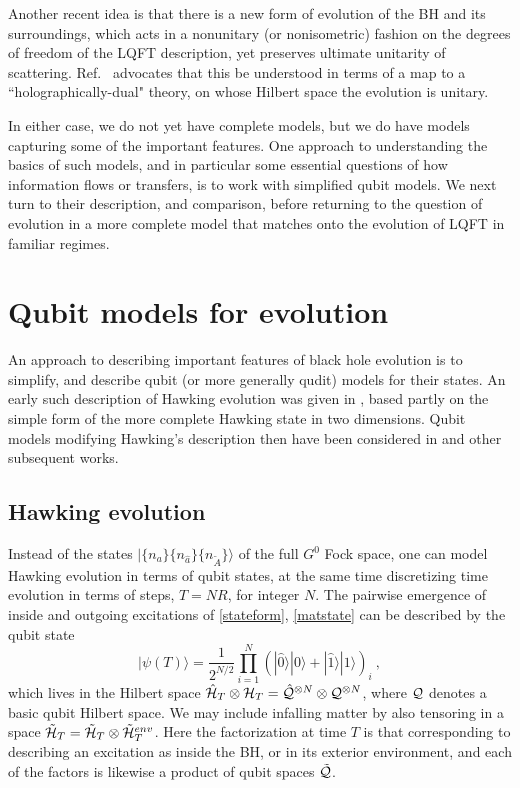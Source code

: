 \documentclass[12pt]{article}
\numberwithin{equation}{section}
\newcommand{\calh}{{\cal H}}
\newcommand{\calq}{{\cal Q}}
\newcommand{\beq}{\begin{equation}}
\newcommand{\eeq}{\end{equation}}
\begin{document}
Another recent idea\cite{AEHPV} is that there is a new form of evolution of the BH and its surroundings, which acts in a nonunitary (or nonisometric) fashion on the degrees of freedom of the LQFT description, yet preserves ultimate unitarity of scattering.  Ref.~\cite{AEHPV} advocates that this be understood in terms of a map to a ``holographically-dual" theory, on whose Hilbert space the evolution is unitary.  

In either case, we do not yet have complete models, but we do have models capturing some of the important features.  One approach to understanding the basics of such models, and in particular some essential questions of how information flows or transfers, is to work with simplified qubit models.  We next turn to their description, and comparison, before returning to the question of evolution in a more complete model that matches onto the evolution of LQFT in familiar regimes.


\section{Qubit models for evolution}

An approach to describing important features of black hole evolution is to simplify, and describe qubit (or more generally qudit) models for their states. An early such description of Hawking evolution was given in \cite{Mathinforev}, based partly on the simple form of the more complete Hawking state in two dimensions\cite{GiNe}.  Qubit models modifying Hawking's description then have been considered in \cite{Mathinforev,SGmodels,BHQIUE,GiShone} and other subsequent works.

\subsection{Hawking evolution}

Instead of the states $|{\{n_a\}\{n_{\hat a}\}\{n_{\tilde A}\}}\rangle$ of the full $G^0$ Fock space, one can model Hawking evolution in terms of qubit states, at the same time discretizing time evolution in terms of steps, $T=NR$, for integer $N$.  The pairwise emergence of inside and outgoing excitations of  \eqref{stateform}, \eqref{matstate} can be described by the qubit state
\beq\label{HawkQ}
|\psi(T)\rangle = \frac{1}{2^{N/2}}\prod_{i=1}^N \left(|\hat 0\rangle |0\rangle + |\hat 1\rangle |1\rangle\right)_i\ ,
\eeq
which lives in the Hilbert space $\hat\calh_T\otimes \calh_T=\hat \calq^{\otimes N}\otimes \calq^{\otimes N}$, where $\calq$ denotes a basic qubit Hilbert space.  We may include infalling matter by also tensoring in a space $\tilde \calh_T =  \tilde \calh_T \otimes \tilde \calh^{env}_T$.  Here the factorization at time $T$ is that corresponding to describing an excitation as inside the BH, or in its exterior environment, and each of the factors is likewise a product of qubit spaces $\tilde \calq$.  
\end{document}
